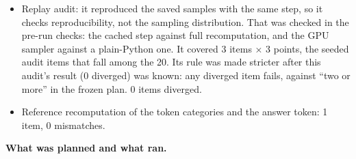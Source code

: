\documentclass[
  10pt,
  a4paper,
]{article}
\providecommand{\tightlist}{%
  \setlength{\itemsep}{0pt}\setlength{\parskip}{0pt}}
\begin{document}
\begin{itemize}
  \begin{itemize}
  \tightlist
  \item
    Replay audit: it reproduced the saved samples with the same step, so it checks reproducibility, not the sampling distribution. That was checked in the pre-run checks: the cached step against full
    recomputation, and the GPU sampler against a plain-Python one. It covered 3 items × 3 points, the seeded audit items that fall among the 20. Its rule was made stricter after this audit's result (0
    diverged) was known: any diverged item fails, against ``two or more'' in the frozen plan. 0 items diverged.
  \item
    Reference recomputation of the token categories and the answer token: 1 item, 0 mismatches.
  \end{itemize}
\end{itemize}

\textbf{What was planned and what ran.}
\end{document}
